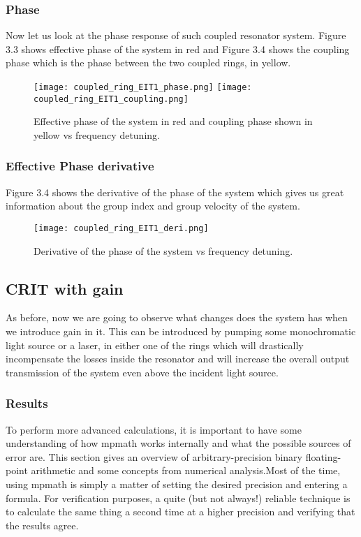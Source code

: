 \subsubsection{Phase}

Now let us look at the phase response of such coupled resonator system. Figure 3.3 shows effective phase of the system in red and Figure 3.4 shows the coupling phase which is the phase between the two coupled rings, in yellow. 

\begin{figure}[h]
\texttt{[image: coupled\_ring\_EIT1\_phase.png]}
\texttt{[image: coupled\_ring\_EIT1\_coupling.png]}
\caption{Effective phase of the system in red and coupling phase shown in yellow vs frequency detuning.}
\end{figure}

\subsubsection{Effective Phase derivative}
Figure 3.4 shows the derivative of the phase of the system which gives us great information about the group index and group velocity of the system. 
\begin{figure}[h]
\centering
\texttt{[image: coupled\_ring\_EIT1\_deri.png]}
\caption{Derivative of the phase of the system vs frequency detuning.}
\end{figure}


\subsection{CRIT with gain}
As before, now we are going to observe what changes does the system has when we introduce gain in it. This can be introduced by pumping some monochromatic light source or a laser, in either one of the rings which will drastically incompensate the losses inside the resonator and will increase the overall output transmission of the system even above the incident light source. 
\subsubsection*{Results}
To perform more advanced calculations, it is important to have some understanding of how mpmath works internally and what the possible sources of error are. This section gives an overview of arbitrary-precision binary floating-point arithmetic and some concepts from numerical analysis.Most of the time, using mpmath is simply a matter of setting the desired precision and entering a formula. For verification purposes, a quite (but not always!) reliable technique is to calculate the same thing a second time at a higher precision and verifying that the results agree.

